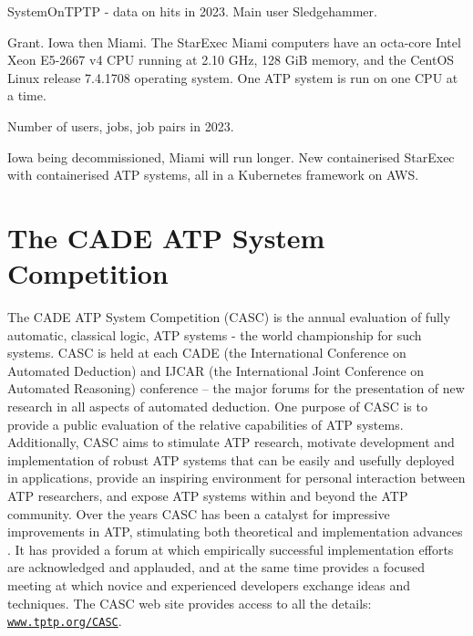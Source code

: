 \documentclass{easychair}
\begin{document}
SystemOnTPTP - data on hits in 2023.
Main user Sledgehammer.

Grant. Iowa then Miami.
The StarExec Miami computers have an
octa-core Intel Xeon E5-2667 v4 CPU running at 2.10 GHz,
128 GiB memory,
and the CentOS Linux release 7.4.1708 operating system.
One ATP system is run on one CPU at a time.

Number of users, jobs, job pairs in 2023.

Iowa being decommissioned, Miami will run longer. New containerised StarExec with containerised
ATP systems, all in a Kubernetes framework on AWS.

\section{The CADE ATP System Competition}
\label{CASC}

The CADE ATP System Competition (CASC) \cite{Sut16} is the annual evaluation of fully automatic,
classical logic, ATP systems - the world championship for such systems.
CASC is held at each CADE (the International Conference on Automated Deduction) and IJCAR
(the International Joint Conference on Automated Reasoning) conference -- the major forums
for the presentation of new research in all aspects of automated deduction.
One purpose of CASC is to provide a public evaluation of the relative capabilities of ATP systems.
Additionally, CASC aims to
stimulate ATP research,
motivate development and implementation of robust ATP systems that can be easily and usefully
deployed in applications,
provide an inspiring environment for personal interaction between ATP researchers,
and
expose ATP systems within and beyond the ATP community.
Over the years CASC has been a catalyst for impressive improvements in ATP, stimulating both 
theoretical and implementation advances \cite{Nie02-Paper}.
It has provided a forum at which empirically successful implementation efforts are acknowledged 
and applauded, and at the same time provides a focused meeting at which novice and experienced 
developers exchange ideas and techniques. 
The CASC web site provides access to all the details:
\href{http://www.tptp.org/CASC/}{{\tt www.tptp.org/CASC}}.
\end{document}

